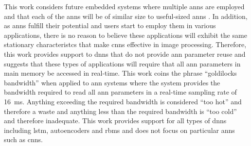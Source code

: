 \documentclass[journal]{IEEEtran}
\begin{document}
This work considers future embedded systems where multiple \acp{ann} are employed \cite{bojarski2016end} and that each of the \acp{ann} will be of similar size to useful-sized \acp{ann} \cite{krizhevsky2012imagenet}.
In addition, as \acp{ann} fulfill their potential and users start to employ them in various applications, there is no reason to believe these applications will exhibit the same stationary characteristcs that make \acp{cnn} effective in image processing.
Therefore, this work provides support to \acp{dnn} that do not provide \ac{ann} parameter reuse \cite{coates2013deep} and suggests that these types of applications will require that all \ac{ann} parameters in main memory be accessed in real-time.
This work coins the phrase ``goldilocks bandwidth'' when applied to \ac{ann} systems where the system provides the bandwidth required to read all \ac{ann} parameters in a real-time sampling rate of \SI{16}{\milli\second}. 
Anything exceeding the required bandwidth is considered ``too hot'' and therefore a waste and anything less than the required bandwidth is ``too cold'' and therefore inadequate.
This work provides support for all types of \acp{dnn} including \ac{lstm}, autoencoders and \acp{rbm} and does not focus on particular \acp{ann} such as \acp{cnn}.
\end{document}
